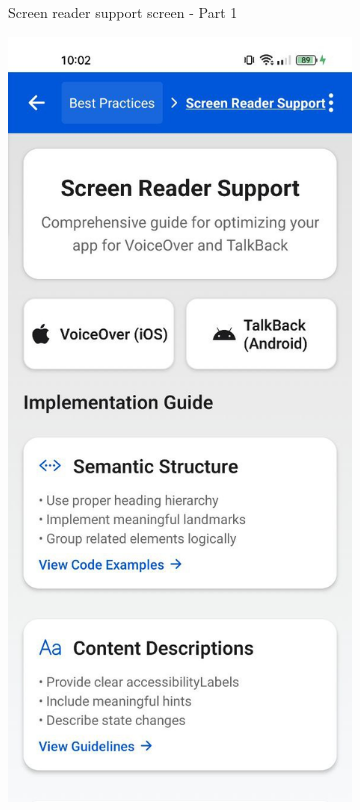 \begin{enumerate}
\begin{itemize}
\begin{figure}[ht]
\begin{subfigure}[b]{0.48\textwidth}
                \caption{Screen reader support screen - Part 1}
                \label{fig:screen-reader-left}
            \end{subfigure}
            \hfill
            \begin{subfigure}[b]{0.48\textwidth}
                \centering
                \includegraphics[width=\linewidth, alt={Second part of the Screen reader support screen}]{img/screenreader2.jpg}

\end{subfigure}
\end{figure}
\end{itemize}
\end{enumerate}
